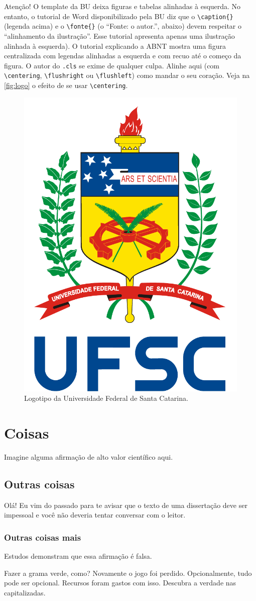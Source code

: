 \documentclass[embeddedlogo]{ufsc-thesis-rn46-2019}
\newcommand{\lacmd}[1]{\texttt{\textbackslash{}#1}}
\begin{document}
Atenção! O template da BU deixa figuras e tabelas alinhadas à esquerda. No
entanto, o tutorial de Word disponibilizado pela BU diz que o \lacmd{caption\{\}}
(legenda acima) e o \lacmd{fonte\{\}} (o ``Fonte: o autor.'', abaixo) devem
respeitar o ``alinhamento da ilustração''. Esse tutorial apresenta apenas uma
ilustração alinhada à esquerda). O tutorial explicando a ABNT mostra uma figura
centralizada com legendas alinhadas a esquerda e com recuo até o começo da
figura. O autor do \texttt{.cls} se exime de qualquer culpa. Alinhe aqui (com
\lacmd{centering}, \lacmd{flushright} ou \lacmd{flushleft}) como mandar o seu
coração. Veja na \autoref{fig:logo} o efeito de se usar \lacmd{centering}.

\begin{figure}[t]
  \centering
  \caption{Logotipo da Universidade Federal de Santa Catarina.}
  \label{fig:logo}

  \includegraphics[width=.2\linewidth]{../logo-ufsc.pdf}
\end{figure}

\section{Coisas}
\label{sec:stuff}
Imagine alguma afirmação de alto valor científico aqui.

\subsection{Outras coisas}
\label{sec:more}
Olá! Eu vim do passado para te avisar que o texto de uma dissertação deve ser
impessoal e você não deveria tentar conversar com o leitor.

\subsubsection{Outras coisas mais}
\label{sec:yet-more}
Estudos demonstram que essa afirmação é falsa.

\label{sec:yet-another}
Fazer a grama verde, como? Novamente o jogo foi perdido. Opcionalmente, tudo
pode ser opcional. Recursos foram gastos com isso. Descubra a verdade nas
capitalizadas.


\postextual

\end{document}
